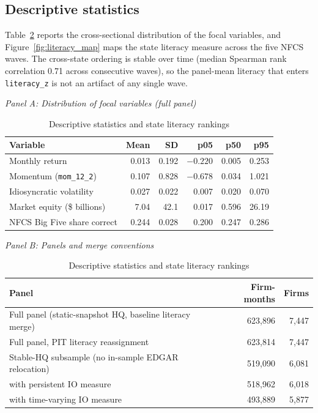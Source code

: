 \subsection{Descriptive statistics}

Table~\ref{tab:descriptives} reports the cross-sectional distribution of the focal variables, and Figure~\ref{fig:literacy_map} maps the state literacy measure across the five NFCS waves. The cross-state ordering is stable over time (median Spearman rank correlation 0.71 across consecutive waves), so the panel-mean literacy that enters \texttt{literacy\_z} is not an artifact of any single wave.

\begin{table}[t]
\centering
\caption{Descriptive statistics and state literacy rankings}
\label{tab:descriptives}
\footnotesize
\begin{minipage}{\textwidth}
\centering
\textit{Panel A: Distribution of focal variables (full panel)}\\[2pt]
\begin{tabular}{lrrrrr}
\toprule
Variable & Mean & SD & p05 & p50 & p95 \\
\midrule
Monthly return            & 0.013 & 0.192 & $-0.220$ & 0.005 & 0.253 \\
Momentum (\texttt{mom\_12\_2})   & 0.107 & 0.828 & $-0.678$ & 0.034 & 1.021 \\
Idiosyncratic volatility       & 0.027 & 0.022 & 0.007 & 0.020 & 0.070 \\
Market equity (\$ billions)    & 7.04  & 42.1  & 0.017 & 0.596 & 26.19 \\
NFCS Big Five share correct    & 0.244 & 0.028 & 0.200 & 0.247 & 0.286 \\
\bottomrule
\end{tabular}

\medskip
\textit{Panel B: Panels and merge conventions}\\[2pt]
\begin{tabular}{lrr}
\toprule
Panel & Firm-months & Firms \\
\midrule
Full panel (static-snapshot HQ, baseline literacy merge)  & 623,896 & 7,447 \\
Full panel, PIT literacy reassignment                     & 623,814 & 7,447 \\
Stable-HQ subsample (no in-sample EDGAR relocation)       & 519,090 & 6,081 \\
\quad with persistent IO measure                          & 518,962 & 6,018 \\
\quad with time-varying IO measure                        & 493,889 & 5,877 \\
\bottomrule
\end{tabular}


\end{minipage}
\end{table}

